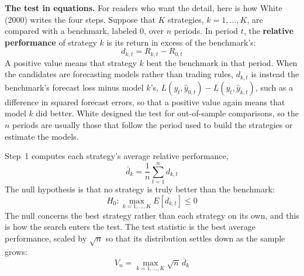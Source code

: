 \textbf{The test in equations.} For readers who want the detail, here is how White (2000) writes the four steps. Suppose that $K$ strategies, $k = 1, \dots, K$, are compared with a benchmark, labeled $0$, over $n$ periods. In period $t$, the \textbf{relative performance} of strategy $k$ is its return in excess of the benchmark's:
\begin{equation}
  d_{k,t} = R_{k,t} - R_{0,t}
  \label{eq:03-rc-diff}
\end{equation}
A positive value means that strategy $k$ beat the benchmark in that period. When the candidates are forecasting models rather than trading rules, $d_{k,t}$ is instead the benchmark's forecast loss minus model $k$'s, $L(y_t, \hat{y}_{0,t}) - L(y_t, \hat{y}_{k,t})$, such as a difference in squared forecast errors, so that a positive value again means that model $k$ did better. White designed the test for out-of-sample comparisons, so the $n$ periods are usually those that follow the period used to build the strategies or estimate the models.

Step~1 computes each strategy's average relative performance,
\begin{equation}
  \bar{d}_k = \frac{1}{n} \sum_{t=1}^{n} d_{k,t}
  \label{eq:03-rc-mean}
\end{equation}
The null hypothesis is that no strategy is truly better than the benchmark:
\begin{equation}
  H_0: \max_{k = 1, \dots, K} E\left[d_{k,t}\right] \le 0
  \label{eq:03-rc-null}
\end{equation}
The null concerns the best strategy rather than each strategy on its own, and this is how the search enters the test. The test statistic is the best average performance, scaled by $\sqrt{n}$ so that its distribution settles down as the sample grows:
\begin{equation}
  V_n = \max_{k = 1, \dots, K} \sqrt{n}\, \bar{d}_k
  \label{eq:03-rc-stat}
\end{equation}

